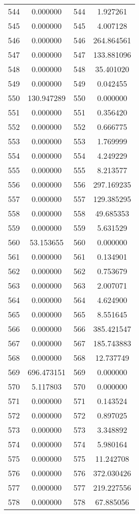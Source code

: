\documentclass[12pt]{article}
\begin{document}
\begin{longtable}{@{}cccc@{}}
544 & 0.000000 & 544 & 1.927261 \\
545 & 0.000000 & 545 & 4.007128 \\
546 & 0.000000 & 546 & 264.864561 \\
547 & 0.000000 & 547 & 133.881096 \\
548 & 0.000000 & 548 & 35.401020 \\
549 & 0.000000 & 549 & 0.042455 \\
550 & 130.947289 & 550 & 0.000000 \\
551 & 0.000000 & 551 & 0.356420 \\
552 & 0.000000 & 552 & 0.666775 \\
553 & 0.000000 & 553 & 1.769999 \\
554 & 0.000000 & 554 & 4.249229 \\
555 & 0.000000 & 555 & 8.213577 \\
556 & 0.000000 & 556 & 297.169235 \\
557 & 0.000000 & 557 & 129.385295 \\
558 & 0.000000 & 558 & 49.685353 \\
559 & 0.000000 & 559 & 5.631529 \\
560 & 53.153655 & 560 & 0.000000 \\
561 & 0.000000 & 561 & 0.134901 \\
562 & 0.000000 & 562 & 0.753679 \\
563 & 0.000000 & 563 & 2.007071 \\
564 & 0.000000 & 564 & 4.624900 \\
565 & 0.000000 & 565 & 8.551645 \\
566 & 0.000000 & 566 & 385.421547 \\
567 & 0.000000 & 567 & 185.743883 \\
568 & 0.000000 & 568 & 12.737749 \\
569 & 696.473151 & 569 & 0.000000 \\
570 & 5.117803 & 570 & 0.000000 \\
571 & 0.000000 & 571 & 0.143524 \\
572 & 0.000000 & 572 & 0.897025 \\
573 & 0.000000 & 573 & 3.348892 \\
574 & 0.000000 & 574 & 5.980164 \\
575 & 0.000000 & 575 & 11.242708 \\
576 & 0.000000 & 576 & 372.030426 \\
577 & 0.000000 & 577 & 219.227556 \\
578 & 0.000000 & 578 & 67.885056 \\

\end{longtable}
\end{document}

